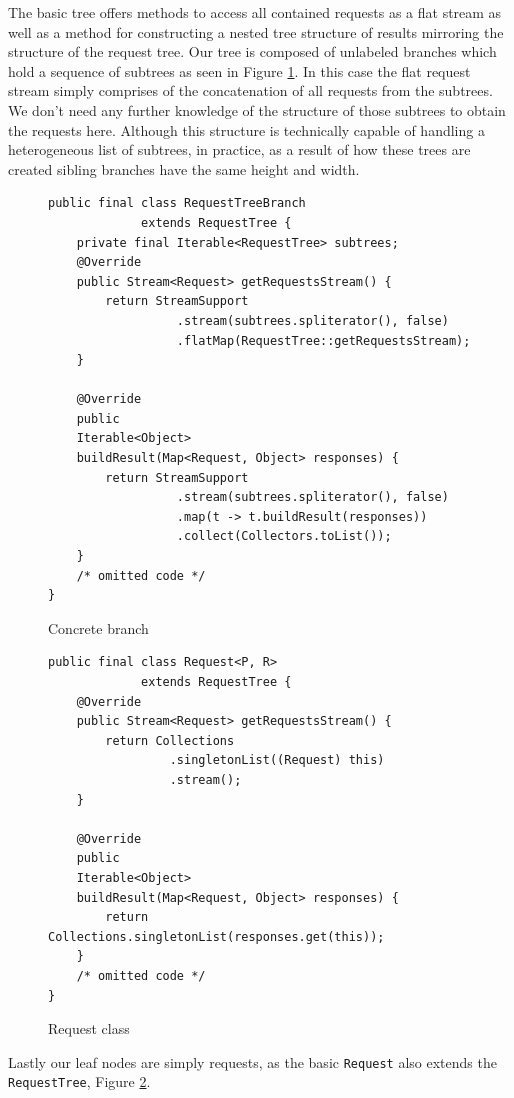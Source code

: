 The basic tree offers methods to access all contained requests as a flat stream as well as a method for constructing a nested tree structure of results mirroring the structure of the request tree.
Our tree is composed of unlabeled branches which hold a sequence of subtrees as seen in Figure \ref{fig:tree-impl-branch}.
In this case the flat request stream simply comprises of the concatenation of all requests from the subtrees.
We don't need any further knowledge of the structure of those subtrees to obtain the requests here.
Although this structure is technically capable of handling a heterogeneous list of subtrees, in practice, as a result of how these trees are created sibling branches have the same height and width.

\begin{figure}

\begin{verbatim}
public final class RequestTreeBranch
             extends RequestTree {
    private final Iterable<RequestTree> subtrees;
    @Override
    public Stream<Request> getRequestsStream() {
        return StreamSupport
                  .stream(subtrees.spliterator(), false)
                  .flatMap(RequestTree::getRequestsStream);
    }

    @Override
    public
    Iterable<Object>
    buildResult(Map<Request, Object> responses) {
        return StreamSupport
                  .stream(subtrees.spliterator(), false)
                  .map(t -> t.buildResult(responses))
                  .collect(Collectors.toList());
    }
    /* omitted code */
}
\end{verbatim}
\caption{Concrete branch}
\label{fig:tree-impl-branch}

\end{figure}


\begin{figure}

\begin{verbatim}
public final class Request<P, R>
             extends RequestTree {
    @Override
    public Stream<Request> getRequestsStream() {
        return Collections
                 .singletonList((Request) this)
                 .stream();
    }

    @Override
    public
    Iterable<Object>
    buildResult(Map<Request, Object> responses) {
        return Collections.singletonList(responses.get(this));
    }
    /* omitted code */
}
\end{verbatim}

\caption{Request class}
\label{fig:tree-impl-request-class}
\end{figure}

Lastly our leaf nodes are simply requests, as the basic \texttt{Request} also extends the \texttt{RequestTree}, Figure \ref{fig:tree-impl-request-class}.
